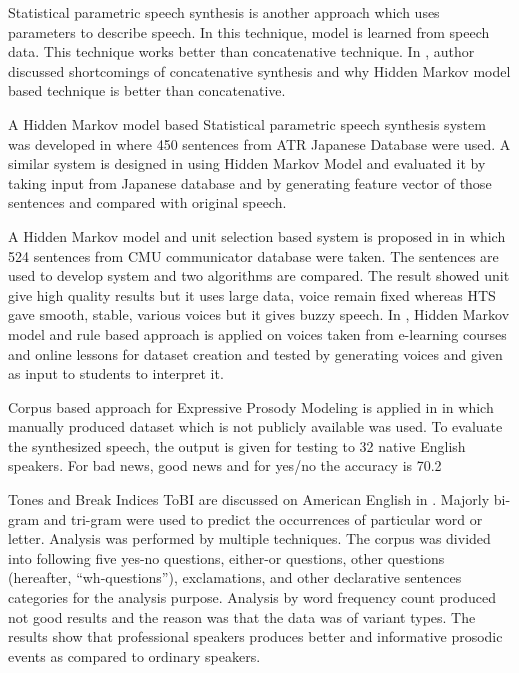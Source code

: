 Statistical parametric speech synthesis is another approach which uses parameters to describe
speech. In this technique, model is learned from speech data. This technique works better than
concatenative technique. In \cite{merritt2013investigating}, author discussed shortcomings of concatenative
synthesis and why Hidden Markov model based technique is better than concatenative.

A Hidden Markov model based Statistical parametric speech synthesis system was developed in
\cite{yoshimura1998duration} where 450 sentences from ATR Japanese Database were used.  A similar system is designed in 
\cite{tokuda2000speech} using Hidden Markov Model and evaluated it by taking input
from Japanese database and by generating feature vector of those sentences and compared with
original speech.


A Hidden Markov model and unit selection based system is proposed in \cite{tokuda2002hmm} in which
524 sentences from CMU communicator database were taken. The sentences are used to develop
system and two algorithms are compared. The result showed unit give high quality results but it
uses large data, voice remain fixed whereas HTS gave smooth, stable, various voices but it gives
buzzy speech. In \cite{harashima2006review}, Hidden Markov model and rule based approach is applied 
on voices taken from e-learning courses and online lessons for dataset creation and tested by
generating voices and given as input to students to interpret it.


Corpus based approach for Expressive Prosody Modeling is applied in \cite{eide2004corpus} in which
manually produced dataset which is not publicly available was used. To evaluate the synthesized
speech, the output is given for testing to 32 native English speakers. For bad news, good news and
for yes/no the accuracy is 70.2%


Tones and Break Indices ToBI are discussed on American English in \cite{pitrelli2004tobi}. Majorly
bi-gram and tri-gram were used to predict the occurrences of particular word or letter. Analysis
was performed by multiple techniques. The corpus was divided into following five yes-no
questions, either-or questions, other questions (hereafter, “wh-questions”), exclamations, and other
declarative sentences categories for the analysis purpose. Analysis by word frequency count
produced not good results and the reason was that the data was of variant types. The results show
that professional speakers produces better and informative prosodic events as compared to
ordinary speakers.

